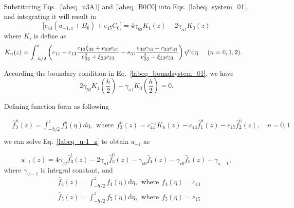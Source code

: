 \documentclass[12pt,sort&compress,fleqn,3p]{elsarticle}
\newcommand{\er}[4]{{#1}_{#2}{#3}_{#4}}
\begin{document}
Substituting Eqs.~\eqref{labeq_u3A1} and  \eqref{labeq_B0C0}  into  Eqs.~\eqref{labeq_system_01}, and integrating it will result in
\begin{equation}\label{labeq_u-1_z}
\big[c_{44}(u_{-1,z}+B_{0})+\er{e}{15}{C}{0}\big]=4\gamma_{b2}K_{1}(z)-2\gamma_{a1}K_{0}(z)
\end{equation}
where $K_i$ is define as
\begin{equation}\label{labeq_AppBKidefine}
\begin{split}
&K_{n}(z)=\int_{-h/2}^{z}\left(c_{11}-c_{13}\frac{\er{c}{13}{\xi}{33}+e_{33}e_{31}}
{e_{33}^{2}+\xi_{33}c_{33}}-e_{31}\frac{e_{33}c_{13}-\er{c}{33}{e}{31}}{e_{33}^{2}+\xi_{33}c_{33}}\right)\eta^{n}\mathrm{d}\eta\hspace{0.5cm}(n=0,1,2).
\end{split}
\end{equation}

According the boundary condition in   Eq.~\eqref{labeq_boundsystem_01}, we have
\begin{equation}\label{labeq_b2a1_constrain}
2\gamma_{b2}K_{1}(\dfrac{h}{2})-\gamma_{a1}K_{0}(\dfrac{h}{2})=0.
\end{equation}


Defining   function form  as following

\begin{equation}\label{labeq_f2nf4}
\begin{split}
&   \hat{f}^n_{3}(z)  =  \int_{-h/2}^{z} f^n_{3}(\eta)   d\eta,   ~~\text{where}~~    f^n_{3}(z)=c_{44}^{-1}K_{n}(z)-c_{44}\hat{f}^n_{1}(z)-e_{15}\hat{f}^n_{2}(z), \quad n=0,1\\
\end{split}
\end{equation}
we can solve Eq.~\eqref{labeq_u-1_z} to  obtain $u_{-1}$ as

\begin{equation}\label{labeq_u-1}
u_{-1}(z)=4\gamma_{b2}\hat{f}^1_{3}(z)-2\gamma_{a1}\hat{f}^0_{3}(z)-  \gamma_{b0}\hat{f}_4(z)  -  \gamma_{c0}\hat{f}_5(z)   +\gamma_{u-1},
\end{equation}
where $\gamma_{u-1}$ is integral constant, and
\begin{equation}\label{labeq_f4f5}
\begin{split}
&\hat{f}_{4}(z)=\int_{-h/2}^{z}f_4(\eta) \mathrm{d}\eta,  ~~\text{where}~~ f_4(\eta) = c_{44}  \\
&\hat{f}_{5}(z)=\int_{-h/2}^{z}f_5(\eta) \mathrm{d}\eta, ~~\text{where}~~  f_5(\eta) = e_{15} \\
\end{split}
\end{equation}
\end{document}
